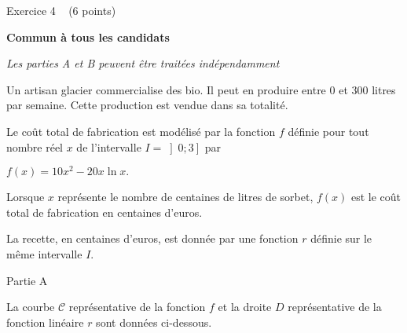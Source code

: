 
%
\begin{h2}Exercice 4   (6 points)\end{h2}
\textbf{Commun à tous les candidats}
\par
\textit{Les parties A et B peuvent être traitées indépendamment}
\par
Un artisan glacier commercialise des \ogsorbets bio\fg{}. Il peut en produire entre 0 et 300 litres par semaine. Cette production est vendue dans sa totalité.
\par
Le coût total de fabrication est modélisé par la fonction $f$ définie pour tout nombre réel $x$ de l'intervalle $I=\left]0 ; 3\right]$ par
\par
$f\left(x\right)=10x^{2}-20x \ln x.$
\par
Lorsque $x$ représente le nombre de centaines de litres de sorbet, $f\left(x\right)$ est le coût total de fabrication en centaines d'euros.
\par
La recette, en centaines d'euros, est donnée par une fonction $r$ définie sur le même intervalle $I$.
\begin{h3}Partie A\end{h3}
La courbe $\mathscr C$ représentative de la fonction $f$ et la droite $D$ représentative de la fonction linéaire $r$ sont données ci-dessous.

